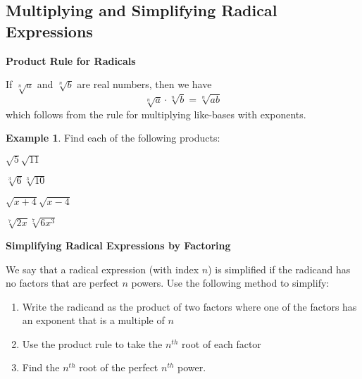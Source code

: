 \documentclass[addpoints,12pt]{exam}
\theoremstyle{definition}
\newtheorem{example}{Example}[subsection]
\begin{document}
\setcounter{section}{10}
\setcounter{subsection}{2}

\subsection{Multiplying and Simplifying Radical Expressions}

\begin{mdframed}
\textbf{Product Rule for Radicals}

If $\sqrt[n]{a}$ and $\sqrt[n]{b}$ are real numbers, then we have \[\sqrt[n]{a}\cdot\sqrt[n]{b} = \sqrt[n]{ab}\] which follows from the rule for multiplying like-bases with exponents.
\end{mdframed}

\vspace{.25in}

\begin{example}
Find each of the following products:
\begin{enumerate}
\begin{minipage}{.5\textwidth}
\item $\sqrt{5}\sqrt{11}$
\vspace{1.5in}
\item $\sqrt[3]{6}\sqrt[3]{10}$
\vspace{1.5in}
\end{minipage}%
\begin{minipage}{.5\textwidth}
\item $\sqrt{x+4}\sqrt{x-4}$
\vspace{1.5in}
\item $\sqrt[7]{2x}\sqrt[7]{6x^3}$
\vspace{1.5in}
\end{minipage}%
\end{enumerate}
\end{example}


\newpage

\begin{mdframed}
\textbf{Simplifying Radical Expressions by Factoring}

We say that a radical expression (with index $n$) is simplified if the radicand has no factors that are perfect $n$ powers. Use the following method to simplify:
\begin{enumerate}
\item Write the radicand as the product of two factors where one of the factors has an exponent that is a multiple of $n$
\item Use the product rule to take the $n^{th}$ root of each factor
\item Find the $n^{th}$ root of the perfect $n^{th}$ power.
\end{enumerate}
\end{mdframed}
\end{document}
